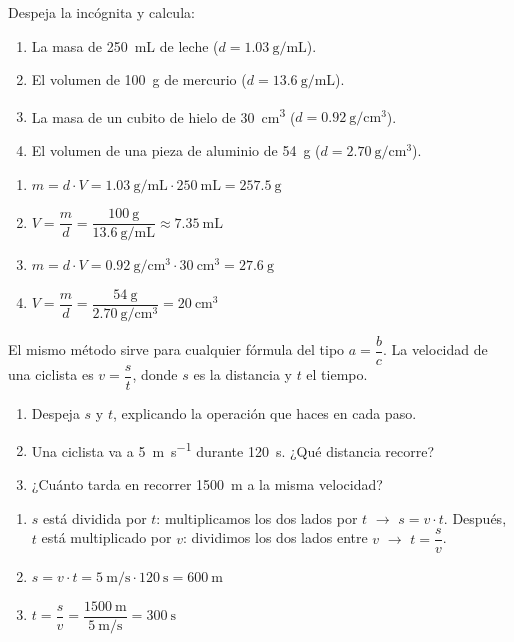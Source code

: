 \begin{exercise}
    Despeja la incógnita y calcula:
    \begin{enumerate}[label=\letraminuscula]
        \item La masa de \qty{250}{\mL} de leche (\(d = \qty{1.03}{\g\per\mL}\)).
        \item El volumen de \qty{100}{\g} de mercurio (\(d = \qty{13.6}{\g\per\mL}\)).
        \item La masa de un cubito de hielo de \qty{30}{\cubic\cm} (\(d = \qty{0.92}{\g\per\cubic\cm}\)).
        \item El volumen de una pieza de aluminio de \qty{54}{\g} (\(d = \qty{2.70}{\g\per\cubic\cm}\)).
    \end{enumerate}
    \begin{solu}
        \begin{enumerate}[label=\alph*)]
            \item \(m = d \cdot V = \qty{1.03}{\g\per\mL} \cdot \qty{250}{\mL} = \qty{257.5}{\g}\)
            \item \(V = \dfrac{m}{d} = \dfrac{\qty{100}{\g}}{\qty{13.6}{\g\per\mL}} \approx \qty{7.35}{\mL}\)
            \item \(m = d \cdot V = \qty{0.92}{\g\per\cubic\cm} \cdot \qty{30}{\cubic\cm} = \qty{27.6}{\g}\)
            \item \(V = \dfrac{m}{d} = \dfrac{\qty{54}{\g}}{\qty{2.70}{\g\per\cubic\cm}} = \qty{20}{\cubic\cm}\)
        \end{enumerate}
    \end{solu}
\end{exercise}

\begin{exercise}
    El mismo método sirve para cualquier fórmula del tipo \(a = \dfrac{b}{c}\). La velocidad de una ciclista es \(v = \dfrac{s}{t}\), donde \(s\) es la distancia y \(t\) el tiempo.
    \begin{enumerate}[label=\letraminuscula]
        \item Despeja \(s\) y \(t\), explicando la operación que haces en cada paso.
        \item Una ciclista va a \qty{5}{\m\per\s} durante \qty{120}{\s}. ¿Qué distancia recorre?
        \item ¿Cuánto tarda en recorrer \qty{1500}{\m} a la misma velocidad?
    \end{enumerate}
    \begin{solu}
        \begin{enumerate}[label=\alph*)]
            \item \(s\) está dividida por \(t\): multiplicamos los dos lados por \(t\) \(\to\) \(s = v \cdot t\). Después, \(t\) está multiplicado por \(v\): dividimos los dos lados entre \(v\) \(\to\) \(t = \dfrac{s}{v}\).
            \item \(s = v \cdot t = \qty{5}{\m\per\s} \cdot \qty{120}{\s} = \qty{600}{\m}\)
            \item \(t = \dfrac{s}{v} = \dfrac{\qty{1500}{\m}}{\qty{5}{\m\per\s}} = \qty{300}{\s}\)
        \end{enumerate}
    \end{solu}
\end{exercise}

